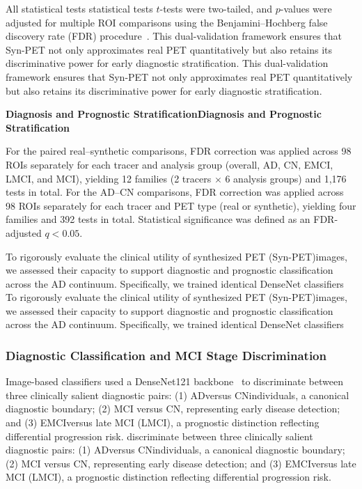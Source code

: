 \documentclass{article}
\providecommand{\DIFaddtex}[1]{{\protect\color{blue} \sf #1}} %
\providecommand{\DIFdeltex}[1]{{\protect\color{red} \ifmmode #1\else\scriptsize #1\fi}} %
\providecommand{\DIFaddbegin}{} %
\providecommand{\DIFaddend}{} %
\providecommand{\DIFdelbegin}{} %
\providecommand{\DIFdelend}{} %
\providecommand{\DIFadd}[1]{\texorpdfstring{\DIFaddtex{#1}}{#1}} %
\providecommand{\DIFdel}[1]{\texorpdfstring{\DIFdeltex{#1}}{}} %
\newcommand{\DIFscaledelfig}{0.5}
\newlength{\DIFdelgraphicswidth} %
\newlength{\DIFdelgraphicsheight} %
\newcommand{\DIFaddincludegraphics}[2][]{{\color{blue}\fbox{\DIFOincludegraphics[#1]{#2}}}} %
\newcommand{\DIFdelincludegraphics}[2][]{%
\sbox{\DIFdelgraphicsbox}{\DIFOincludegraphics[#1]{#2}}%
\settoboxwidth{\DIFdelgraphicswidth}{\DIFdelgraphicsbox} %
\settoboxtotalheight{\DIFdelgraphicsheight}{\DIFdelgraphicsbox} %
\scalebox{\DIFscaledelfig}{%
\parbox[b]{\DIFdelgraphicswidth}{\usebox{\DIFdelgraphicsbox}\\[-\baselineskip] \rule{\DIFdelgraphicswidth}{0em}}\llap{\resizebox{\DIFdelgraphicswidth}{\DIFdelgraphicsheight}{%
\setlength{\unitlength}{\DIFdelgraphicswidth}%
\begin{picture}(1,1)%
\thicklines\linethickness{2pt} %
{\color[rgb]{1,0,0}\put(0,0){\framebox(1,1){}}}%
{\color[rgb]{1,0,0}\put(0,0){\line( 1,1){1}}}%
{\color[rgb]{1,0,0}\put(0,1){\line(1,-1){1}}}%
\end{picture}%
}\hspace*{3pt}}} %
} %
\DeclareRobustCommand{\DIFaddbegin}{\DIFOaddbegin \let\includegraphics\DIFaddincludegraphics} %
\DeclareRobustCommand{\DIFaddend}{\DIFOaddend \let\includegraphics\DIFOincludegraphics} %
\DeclareRobustCommand{\DIFdelbegin}{\DIFOdelbegin \let\includegraphics\DIFdelincludegraphics} %
\DeclareRobustCommand{\DIFdelend}{\DIFOaddend \let\includegraphics\DIFOincludegraphics} %
\begin{document}
All \DIFdelbegin \DIFdel{statistical tests }\DIFdelend \DIFaddbegin \DIFadd{$t$-tests }\DIFaddend were two-tailed, and $p$-values were adjusted for multiple ROI comparisons using the \DIFaddbegin \DIFadd{Benjamini--Hochberg }\DIFaddend false discovery rate (FDR) procedure~\cite{benjamini1995controlling}. \DIFdelbegin \DIFdel{This dual-validation framework ensures that Syn-PET not only approximates real PET quantitatively but also retains its discriminative power for early diagnostic stratification. }%

\par\noindent\DIFdel{\textbf{Diagnosis and Prognostic Stratification}}\par
\DIFdelend \DIFaddbegin \DIFadd{For the paired real--synthetic comparisons, FDR correction was applied across 98 ROIs separately for each tracer and analysis group (overall, AD, CN, EMCI, LMCI, and MCI), yielding 12 families (2 tracers $\times$ 6 analysis groups) and 1,176 tests in total. For the AD--CN comparisons, FDR correction was applied across 98 ROIs separately for each tracer and PET type (real or synthetic), yielding four families and 392 tests in total. Statistical significance was defined as an FDR-adjusted $q<0.05$.
}\DIFaddend 

\DIFdelbegin \DIFdel{To rigorously evaluate the clinical utility of synthesized PET (Syn-PET)images, we assessed their capacity to support diagnostic and prognostic classification across the AD continuum. Specifically, we trained identical DenseNet classifiers }\DIFdelend \DIFaddbegin \subsubsection{\texorpdfstring{\DIFadd{Diagnostic Classification and MCI Stage Discrimination}}{Diagnostic Classification and MCI Stage Discrimination}}
\DIFadd{Image-based classifiers used a DenseNet121 backbone}\DIFaddend ~\cite{huang2017densely} to \DIFdelbegin \DIFdel{discriminate between three clinically salient diagnostic pairs: (1)  ADversus CNindividuals, a canonical diagnostic boundary; (2)  MCI versus CN, representing early disease detection; and (3) EMCIversus late MCI (LMCI), a prognostic distinction reflecting differential progression risk. }%
\end{document}
